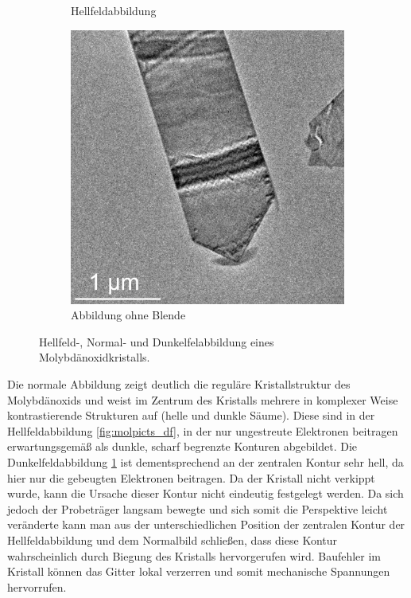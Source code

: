 \documentclass[slug=TEM, room=IFW, supervisor=?, coursedate=23.\ 01.\ 2020]{../../Lab_Report_LaTeX/lab_report}
\begin{document}
\begin{figure}[htp]
\begin{subfigure}{.3\textwidth}
    \caption{Hellfeldabbildung}
    \label{fig:molpicts_hf}
  \end{subfigure}
  \begin{subfigure}{.3\textwidth}
    \includegraphics[width=\textwidth]{../messungen/molybdaen/auswertung/mol_ohne_BLENDE_m.jpg}
    \caption{Abbildung ohne Blende}
    \label{fig:molpicts_n}
  \end{subfigure}
  \caption{Hellfeld-, Normal- und Dunkelfelabbildung eines Molybd\"anoxidkristalls.}
  \label{fig:molpicts}
\end{figure}

Die normale Abbildung zeigt deutlich die regul\"are Kristallstruktur
des Molybdänoxids und weist im Zentrum des Kristalls mehrere in
komplexer Weise kontrastierende Strukturen auf (helle und dunkle
S\"aume). Diese sind in der Hellfeldabbildung \ref{fig:molpicts_df},
in der nur ungestreute Elektronen beitragen erwartungsgem\"a\ss{} als
dunkle, scharf begrenzte Konturen abgebildet. Die Dunkelfeldabbildung
\ref{fig:molpicts_hf} ist dementsprechend an der zentralen Kontur sehr
hell, da hier nur die gebeugten Elektronen beitragen. Da der Kristall
nicht verkippt wurde, kann die Ursache dieser Kontur nicht eindeutig
festgelegt werden. Da sich jedoch der Probetr\"ager langsam bewegte
und sich somit die Perspektive leicht ver\"anderte kann man aus der
unterschiedlichen Position der zentralen Kontur der Hellfeldabbildung
und dem Normalbild schließen, dass diese Kontur wahrscheinlich durch
Biegung des Kristalls hervorgerufen wird. Baufehler im Kristall
k\"onnen das Gitter lokal verzerren und somit mechanische Spannungen
hervorrufen.
\end{document}
